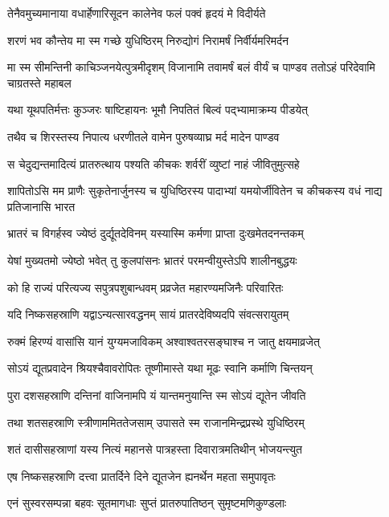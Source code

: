 \twolineshloka
{तेनैवमुच्यमानाया वधार्हेणारिसूदन}
{कालेनेव फलं पक्वं हृदयं मे विदीर्यते}


\twolineshloka
{शरणं भव कौन्तेय मा स्म गच्छे युधिष्ठिरम्}
{निरुद्योगं निरामर्षं निर्वीर्यमरिमर्दन}


\onelineshloka
{मा स्म सीमन्तिनी काचिञ्जनयेत्पुत्रमीदृशम्}
\twolineshloka
{विजानामि तवामर्षं बलं वीर्यं च पाण्डव}
{ततोऽहं परिदेवामि चाग्रतस्ते महाबल}


\twolineshloka
{यथा यूथपतिर्मत्तः कुञ्जरः षाष्टिहायनः}
{भूमौ निपतितं बिल्वं पद्भ्यामाक्रम्य पीडयेत्}


\twolineshloka
{तथैव च शिरस्तस्य निपात्य धरणीतले}
{वामेन पुरुषव्याघ्र मर्द मादेन पाण्डव}


\twolineshloka
{स चेदुद्यन्तमादित्यं प्रातरुत्थाय पश्यति}
{कीचकः शर्वरीं व्युष्टां नाहं जीवितुमुत्सहे}


\threelineshloka
{शापितोऽसि मम प्राणैः सुकृतेनार्जुनस्य च}
{युधिष्ठिरस्य पादाभ्यां यमयोर्जीवितेन च}
{कीचकस्य वधं नाद्य प्रतिजानासि भारत}


\twolineshloka
{भ्रातरं च विगर्हस्व ज्येष्ठं दुर्द्यूतदेविनम्}
{यस्यास्मि कर्मणा प्राप्ता दुःखमेतदनन्तकम्}


\twolineshloka
{येषां मुख्यतमो ज्येष्ठो भवेत् तु कुलपांसनः}
{भ्रातरं परमन्वीयुस्तेऽपि शालीनबुद्धयः}


\twolineshloka
{को हि राज्यं परित्यज्य सपुत्रपशुबान्धवम्}
{प्रव्रजेत महारण्यमजिनैः परिवारितः}


\twolineshloka
{यदि निष्कसहस्राणि यद्वाऽन्यत्सारवद्धनम्}
{सायं प्रातरदेविष्यदपि संवत्सरायुतम्}


\twolineshloka
{रुक्मं हिरण्यं वासांसि यानं युग्यमजाविकम्}
{अश्वाश्वतरसङ्घाश्च न जातु क्षयमाव्रजेत्}


\twolineshloka
{सोऽयं द्यूतप्रवादेन श्रियश्चैवावरोपितः}
{तूष्णीमास्ते यथा मूढः स्वानि कर्माणि चिन्तयन्}


\twolineshloka
{पुरा दशसहस्राणि दन्तिनां वाजिनामपि}
{यं यान्तमनुयान्ति स्म सोऽयं द्यूतेन जीवति}


\twolineshloka
{तथा शतसहस्राणि स्त्रीणाममिततेजसाम्}
{उपासते स्म राजानमिन्द्रप्रस्थे युधिष्ठिरम्}


\twolineshloka
{शतं दासीसहस्राणां यस्य नित्यं महानसे}
{पात्रहस्ता दिवारात्रमतिथीन् भोजयन्त्युत}


\twolineshloka
{एष निष्कसहस्राणि दत्त्वा प्रातर्दिने दिने}
{द्यूतजेन ह्यनर्थेन महता समुपावृतः}


\twolineshloka
{एनं सुस्वरसम्पन्ना बहवः सूतमागधाः}
{सुप्तं प्रातरुपातिष्ठन् सुमृष्टमणिकुण्डलाः}



